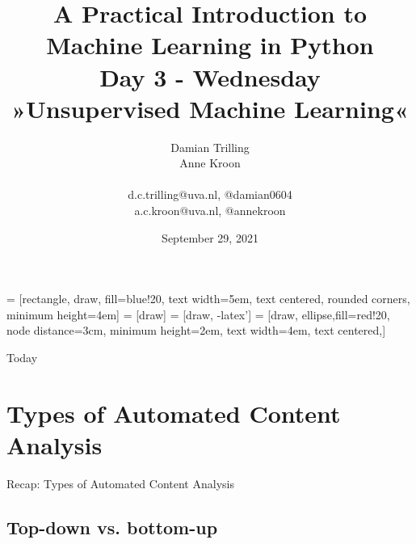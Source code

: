 \documentclass[compress]{beamer}
\begin{document}
\title[Big Data and Automated Content Analysis]{\textbf{A Practical Introduction to Machine Learning in Python} \\Day 3 - Wednesday \\ »Unsupervised Machine Learning«}
\author[Damian Trilling, Anne Kroon]{Damian Trilling \\ Anne Kroon \\ ~ \\ \footnotesize{d.c.trilling@uva.nl, @damian0604 \\a.c.kroon@uva.nl, @annekroon} \\}
\date{September 29, 2021}


 = [rectangle, draw, fill=blue!20, 
text width=5em, text centered, rounded corners, minimum height=4em]
 = [draw]
 = [draw, -latex']
 = [draw, ellipse,fill=red!20, node distance=3cm,
minimum height=2em, text width=4em, text centered,]




\begin{frame}{}
\titlepage
\end{frame}

\begin{frame}{Today}
\tableofcontents
\end{frame}




\section[Automated Content Analysis]{Types of Automated Content Analysis}
\begin{frame}{}
Recap: Types of Automated Content Analysis
\end{frame}
\subsection*{Top-down vs. bottom-up}


\begin{frame}[plain]
\end{frame}
\end{document}
